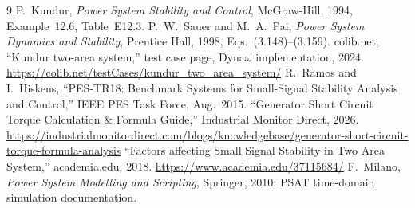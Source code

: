 \documentclass[12pt,a4paper]{article}
\begin{document}
\begin{thebibliography}{9}
 P.~Kundur, \emph{Power System Stability and Control},
McGraw-Hill, 1994, Example~12.6, Table~E12.3.
 P.~W.~Sauer and M.~A.~Pai, \emph{Power System Dynamics
and Stability}, Prentice Hall, 1998, Eqs.~(3.148)--(3.159).
 colib.net, ``Kundur two-area system,'' test case page,
Dyna$\omega$ implementation, 2024.\newline
\url{https://colib.net/testCases/kundur_two_area_system/}
 R.~Ramos and I.~Hiskens, ``PES-TR18: Benchmark Systems for
Small-Signal Stability Analysis and Control,'' IEEE PES Task Force, Aug.~2015.
 ``Generator Short Circuit Torque Calculation
\& Formula Guide,'' Industrial Monitor Direct, 2026.\newline
\url{https://industrialmonitordirect.com/blogs/knowledgebase/generator-short-circuit-torque-formula-analysis}
 ``Factors affecting Small Signal Stability in Two Area
System,'' academia.edu, 2018.\newline
\url{https://www.academia.edu/37115684/}
 F.~Milano, \emph{Power System Modelling and Scripting},
Springer, 2010; PSAT time-domain simulation documentation.
\end{thebibliography}
\end{document}
